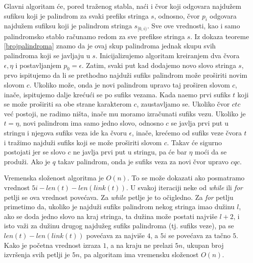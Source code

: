 Glavni algoritam \' ce, pored tra\v zenog stabla, na\' ci i \v cvor koji odgovara najdu\v zem sufiksu koji je palindrom za svaki prefiks stringa $s$, odnosno, \v cvor $p_i$ odgovara najdu\v zem sufiksu koji je palindrom stringa $s_{[0,i)}$. Sve ove vrednosti, kao i samo palindromsko stablo ra\v cunamo redom za sve prefikse stringa $s$. Iz dokaza teoreme \ref{brojpalindroma} znamo da je ovaj skup palindroma jednak skupu svih palindroma koji se javljaju u $s$. Inicijalizujemo algoritam kreiranjem dva \v cvora $\epsilon, \eta$ i postavljanjem $p_0 = \epsilon$. Zatim, svaki put kad dodajemo novo slovo stringa $s$, prvo ispitujemo da li se prethodno najdu\v zi sufiks palindrom mo\v ze pro\v siriti novim slovom $c$. Ukoliko mo\v ze, onda je novi palindrom upravo taj pro\v siren slovom $c$, ina\v ce, ispitujemo dalje kre\' cu\' ci se po sufiks vezama. Kada na\dj emo prvi sufiks $t$ koji se mo\v ze pro\v siriti sa obe strane karakterom $c$, zaustavljamo se. Ukoliko \v cvor $ctc$ ve\' c postoji, ne radimo ni\v sta, ina\v ce mu moramo izra\v cunati sufiks vezu. Ukoliko je $t = \eta$, novi palindrom ima samo jedno slovo, odnosno $c$ se javlja prvi put u stringu i njegova sufiks veza ide ka \v cvoru $\epsilon$, ina\v ce, kre\' cemo od sufiks veze \v cvora $t$ i tra\v zimo najdu\v zi sufiks koji se mo\v ze pro\v siriti slovom $c$. Takav \' ce sigurno postojati jer se slovo $c$ ne javlja prvi put u stringu, pa \' ce bar $\eta$ mo\' ci da se produ\v zi. Ako je $q$ takav palindrom, onda je sufiks veza za novi \v cvor upravo $cqc$.

\noindent
\begin{minipage}[l]{\textwidth}

\end{minipage}

Vremenska slo\v zenost algoritma je $O(n)$. To se mo\v ze dokazati ako posmatramo vrednost $5i-len(t)- len(link(t))$. U svakoj iteraciji neke od \textit{while} ili \textit{for} petlji se ova vrednost pove\' cava. Za \textit{while} petlje je to o\v cigledno. Za \textit{for} petlju primetimo da, ukoliko je najdu\v zi sufiks palindrom nekog stringa imao du\v zinu $l$, ako se doda jedno slovo na kraj stringa, ta du\v zina mo\v ze postati najvi\v se $l+2$, i isto va\v zi za du\v zinu drugog najdu\v zeg sufiks palindroma (tj. sufiks veze), pa se $len(t)- len(link(t))$ pove\' cava za najvi\v se $4$, a $5i$ se pove\'cava za ta\v cno $5$. Kako je po\v cetna vrednost izraza $1$, a na kraju ne prelazi $5n$, ukupan broj izvr\v senja svih petlji je $5n$, pa algoritam ima vremensku slo\v zenost $O(n)$. 

